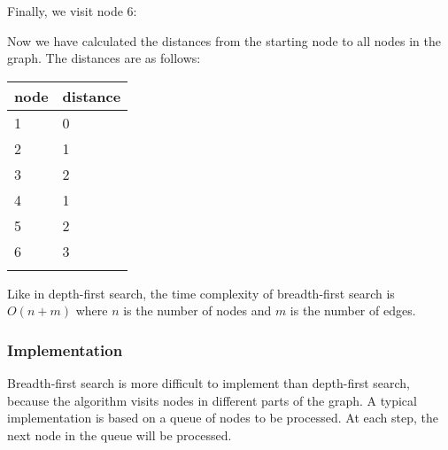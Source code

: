 Finally, we visit node 6:
\begin{center}
\end{center}
Now we have calculated the distances
from the starting node to all nodes in the graph.
The distances are as follows:

\begin{tabular}{ll}
\\
node & distance \\
\hline
1 & 0 \\
2 & 1 \\
3 & 2 \\
4 & 1 \\
5 & 2 \\
6 & 3 \\
\\
\end{tabular}

Like in depth-first search,
the time complexity of breadth-first search
is $O(n+m)$ where $n$ is the number of nodes
and $m$ is the number of edges.

\subsubsection*{Implementation}

Breadth-first search is more difficult
to implement than depth-first search,
because the algorithm visits nodes
in different parts of the graph.
A typical implementation is based on
a queue of nodes to be processed.
At each step, the next node in the queue
will be processed.

